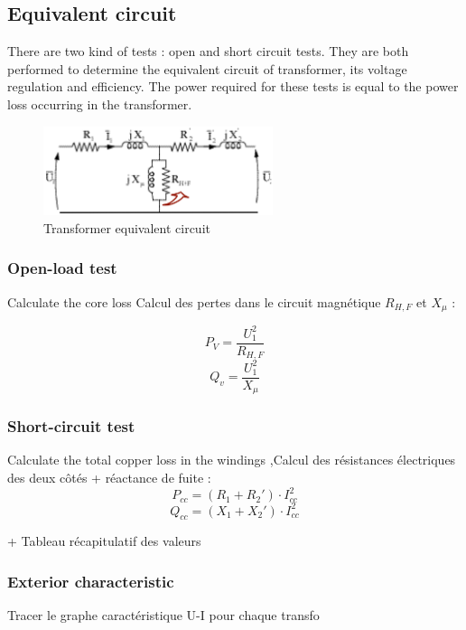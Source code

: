 \documentclass[12pt,a4paper]{report}
\begin{document}
\subsection{Equivalent circuit}
There are two kind of tests : open and short circuit tests. They are both performed to determine the equivalent circuit of transformer, its voltage regulation and efficiency.
The power required for these tests is equal to the power loss occurring in the transformer.

 \begin{figure}[h]
    \centering
    \includegraphics[width=0.6\textwidth]{equivalent_circuit.PNG}
    \caption{Transformer equivalent circuit}
    \label{fig:equivalent_circuit}
\end{figure}

\subsubsection{Open-load test}
Calculate the core loss Calcul des pertes dans le circuit magnétique  $R_{H,F}$ et $X_\mu$ :

\begin{equation}
   P_V = \frac{U_1^2}{R_{H,F}}
\end{equation}
\begin{equation}
   Q_v = \frac{U_1^2}{X_{\mu}}
\end{equation}

\subsubsection{Short-circuit test}
Calculate the total copper loss in the windings ,Calcul des résistances électriques des deux côtés + réactance de fuite :
\begin{equation}
P_{cc} = (R_1 + R_2') \cdot I_{cc}^2
\end{equation}
\begin{equation}
Q_{cc} = (X_1 + X_2') \cdot I_{cc}^2
\end{equation}

+ Tableau récapitulatif des valeurs

\subsubsection{Exterior characteristic}
Tracer le graphe caractéristique U-I pour chaque transfo
\end{document}
